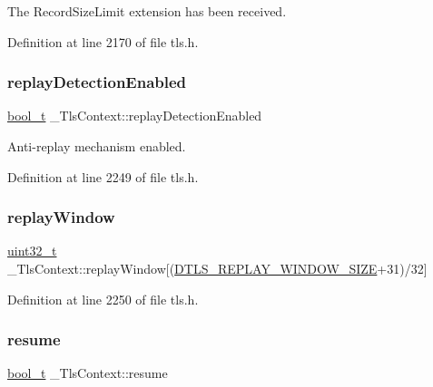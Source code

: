 The Record\+Size\+Limit extension has been received. 



Definition at line 2170 of file tls.\+h.

\mbox{\label{struct__TlsContext_a5bdc45f6229103da62ba653066eec850}} 
\subsubsection{\texorpdfstring{replay\+Detection\+Enabled}{replayDetectionEnabled}}
{\footnotesize\ttfamily \hyperlink{compiler__port_8h_a812d16e5494522586b3784e55d479912}{bool\+\_\+t} \+\_\+\+Tls\+Context\+::replay\+Detection\+Enabled}



Anti-\/replay mechanism enabled. 



Definition at line 2249 of file tls.\+h.

\mbox{\label{struct__TlsContext_ae438744f6aea50a637e038c7b3553358}} 
\subsubsection{\texorpdfstring{replay\+Window}{replayWindow}}
{\footnotesize\ttfamily \hyperlink{stdint_8h_a435d1572bf3f880d55459d9805097f62}{uint32\+\_\+t} \+\_\+\+Tls\+Context\+::replay\+Window\mbox{[}(\hyperlink{dtls__misc_8h_afc5026200d6435351fa01e175671bbfd}{D\+T\+L\+S\+\_\+\+R\+E\+P\+L\+A\+Y\+\_\+\+W\+I\+N\+D\+O\+W\+\_\+\+S\+I\+ZE}+31)/32\mbox{]}}



Definition at line 2250 of file tls.\+h.

\mbox{\label{struct__TlsContext_a8147a82cb2fe5da224fb4f6a8c6357f3}} 
\subsubsection{\texorpdfstring{resume}{resume}}
{\footnotesize\ttfamily \hyperlink{compiler__port_8h_a812d16e5494522586b3784e55d479912}{bool\+\_\+t} \+\_\+\+Tls\+Context\+::resume}



